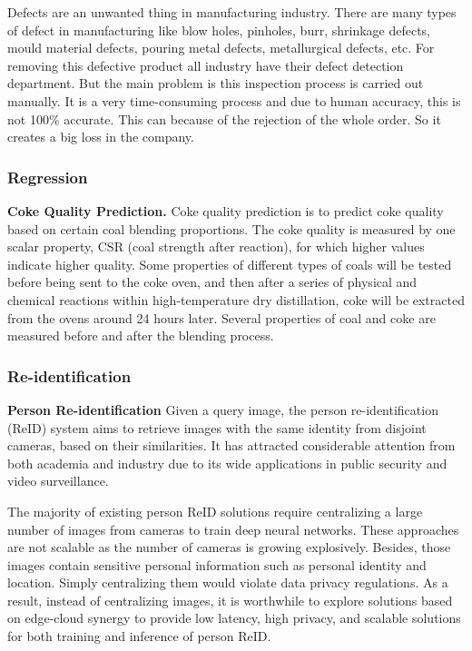 Defects are an unwanted thing in manufacturing industry. There are many types of defect in manufacturing like blow holes, pinholes, burr, shrinkage defects, mould material defects, pouring metal defects, metallurgical defects, etc. For removing this defective product all industry have their defect detection department. But the main problem is this inspection process is carried out manually. It is a very time-consuming process and due to human accuracy, this is not 100\% accurate. This can because of the rejection of the whole order. So it creates a big loss in the company.


\subsubsection{Regression}
\textbf{Coke Quality Prediction.} Coke quality prediction is to predict coke quality based on certain coal blending proportions. The coke quality is measured by one scalar property, CSR (coal strength after reaction), for which higher values indicate higher quality. Some properties of different types of coals will be tested before being sent to the coke oven, and then after a series of physical and chemical reactions within high-temperature dry distillation, coke will be extracted from the ovens around 24 hours later. Several properties of coal and coke are measured before and after the blending process. 



\subsubsection{Re-identification}
\textbf{Person Re-identification} Given a query image, the person re-identification (ReID) system aims to retrieve images with the same identity from disjoint cameras, based on their similarities. It has attracted considerable attention from both academia and industry due to its wide applications in public security and video surveillance. 

The majority of existing person ReID solutions require centralizing a large number of images from cameras to train deep neural networks. These approaches are not scalable as the number of cameras is growing explosively. Besides, those images contain sensitive personal information such as personal identity and location. Simply centralizing them would violate data privacy regulations. As a result, instead of centralizing images, it is worthwhile to explore solutions based on edge-cloud synergy to provide low latency, high privacy, and scalable solutions for both training and inference of person ReID. 